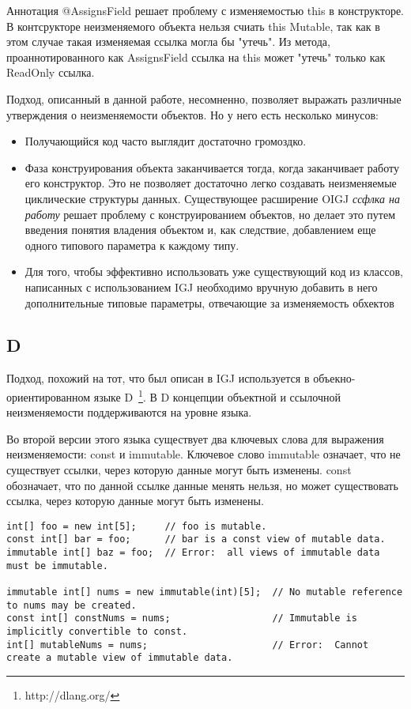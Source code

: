 Аннотация @AssignsField решает проблему с изменяемостью this в конструкторе. В контсрукторе неизменяемого объекта нельзя счиать this Mutable, так как в этом случае такая изменяемая ссылка могла бы "утечь". Из метода, проаннотированного как AssignsField ссылка на this может "утечь" только как ReadOnly ссылка. 

Подход, описанный в данной работе, несомненно, позволяет выражать различные утверждения о неизменяемости объектов. Но у него есть несколько минусов:
\begin{itemize}
\item Получающийся код часто выглядит достаточно громоздко.
\item Фаза конструирования объекта заканчивается тогда, когда заканчивает работу его конструктор. Это не позволяет достаточно легко создавать неизменяемые циклические структуры данных. Существующее расширение OIGJ \textit{ссфлка на работу} решает проблему с конструированием объектов, но делает это путем введения понятия владения объектом и, как следствие, добавлением еще одного типового параметра к каждому типу. 
\item Для того, чтобы эффективно использовать уже существующий код из классов, написанных с использованием IGJ необходимо вручную добавить в него дополнительные типовые параметры, отвечающие за изменяемость обхектов
\end{itemize}

\subsection{D}

Подход, похожий на тот, что был описан в IGJ используется в объекно-ориентированном языке D~\footnote{http://dlang.org/}. В D концепции объектной и ссылочной неизменяемости поддерживаются на уровне языка.

Во второй версии этого языка существует два ключевых слова для выражения неизменяемости: const и immutable. Ключевое слово immutable означает, что не существует ссылки, через которую данные могут быть изменены. const обозначает, что по данной ссылке данные менять нельзя, но может существовать ссылка, через которую данные могут быть изменены. 

\begin{lstlisting}[caption=const vs immutable, label=code:d_const_vs_immutable]
int[] foo = new int[5];     // foo is mutable.
const int[] bar = foo;      // bar is a const view of mutable data.
immutable int[] baz = foo;  // Error:  all views of immutable data must be immutable.
 
immutable int[] nums = new immutable(int)[5];  // No mutable reference to nums may be created.
const int[] constNums = nums;                  // Immutable is implicitly convertible to const.
int[] mutableNums = nums;                      // Error:  Cannot create a mutable view of immutable data.
\end{lstlisting}

